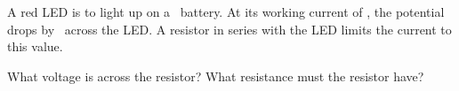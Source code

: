 A red LED is to light up on a \VzO\ battery. At its working current of \IO, the potential drops by \VLO\ across the LED. A resistor in series with the LED limits the current to this value.

\begin{abcliste}
\abc What voltage is across the resistor?
\abc What resistance must the resistor have?
\end{abcliste}

